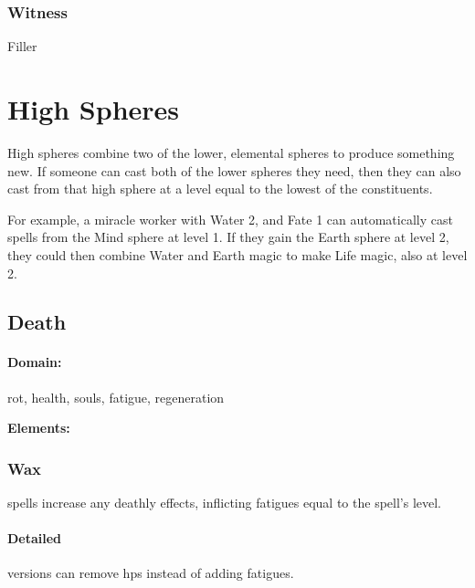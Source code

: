 \begin{multicols}{2}
\subsubsection{Witness}


Filler

\end{multicols}

\section{High Spheres}

\begin{multicols}{2}

\noindent
High spheres combine two of the lower, elemental spheres to produce something new.
If someone can cast both of the lower spheres they need, then they can also cast from that high sphere at a level equal to the lowest of the constituents.

\begin{exampletext}
  For example, a miracle worker with Water 2, and Fate 1 can automatically cast spells from the Mind sphere at level 1.
  If they gain the Earth sphere at level 2, they could then combine Water and Earth magic to make Life magic, also at level 2.
\end{exampletext}

\subsection{Death}
\paragraph{Domain:}
rot, health, souls, fatigue, regeneration

\textbf{Elements:}

\subsubsection{Wax}
spells increase any deathly effects, inflicting \glspl{fatigue} equal to the spell's level.

\paragraph{Detailed}
versions can remove \glspl{hp} instead of adding \glspl{fatigue}.


\end{multicols}
